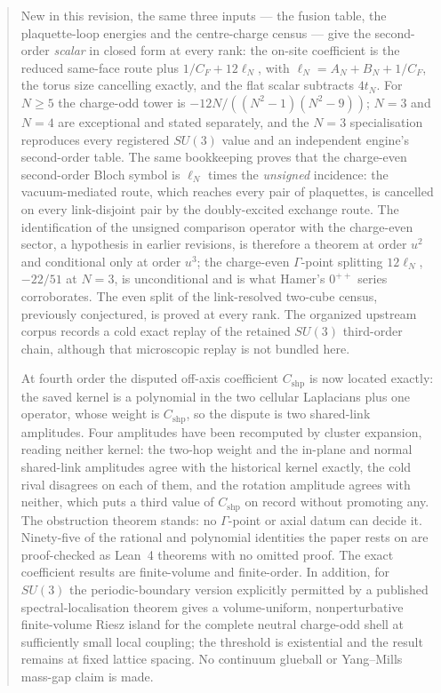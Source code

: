 \documentclass[11pt]{article}
\theoremstyle{plain}
\theoremstyle{definition}
\theoremstyle{remark}
\begin{document}
\begin{abstract}
New in this revision, the same three inputs --- the fusion table, the
plaquette-loop energies and the centre-charge census --- give the second-order
\emph{scalar} in closed form at every rank: the on-site coefficient is the
reduced same-face route plus $1/C_F+12\ell_N$, with $\ell_N=A_N+B_N+1/C_F$,
the torus size cancelling exactly, and the flat scalar subtracts $4t_N$. For
$N\ge5$ the charge-odd tower is $-12N/((N^2-1)(N^2-9))$; $N=3$ and $N=4$ are
exceptional and stated separately, and the $N=3$ specialisation reproduces
every registered $SU(3)$ value and an independent engine's second-order table.
The same bookkeeping proves that the charge-even second-order Bloch symbol is
$\ell_N$ times the \emph{unsigned} incidence: the vacuum-mediated route, which
reaches every pair of plaquettes, is cancelled on every link-disjoint pair by
the doubly-excited exchange route. The identification of the unsigned
comparison operator with the charge-even sector, a hypothesis in earlier
revisions, is therefore a theorem at order $u^2$ and conditional only at order
$u^3$; the charge-even $\Gamma$-point splitting $12\ell_N$, $-22/51$ at $N=3$,
is unconditional and is what Hamer's $0^{++}$ series corroborates. The even
split of the link-resolved two-cube census, previously conjectured, is proved
at every rank. The organized upstream corpus records a cold exact replay of
the retained $SU(3)$ third-order chain, although that microscopic replay is not
bundled here.

At fourth order the disputed off-axis coefficient $C_{\mathrm{shp}}$ is now
located exactly: the saved kernel is a polynomial in the two cellular
Laplacians plus one operator, whose weight is $C_{\mathrm{shp}}$, so the
dispute is two shared-link amplitudes. Four amplitudes have been recomputed
by cluster expansion, reading neither kernel: the two-hop weight and the
in-plane and normal shared-link amplitudes agree with the historical kernel
exactly, the cold rival disagrees on each of them, and the rotation amplitude
agrees with neither, which puts a third value of $C_{\mathrm{shp}}$ on record
without promoting any. The obstruction theorem stands: no $\Gamma$-point or
axial datum can decide it. Ninety-five of the rational and polynomial
identities the paper rests on are proof-checked as Lean~4 theorems with no
omitted proof.
The exact coefficient results are finite-volume and finite-order. In addition,
for $SU(3)$ the periodic-boundary version explicitly permitted by a published
spectral-localisation theorem gives a volume-uniform, nonperturbative
finite-volume Riesz island
for the complete neutral charge-odd
shell at sufficiently small local coupling; the threshold is existential and
the result remains at fixed lattice spacing. No continuum glueball or
Yang--Mills mass-gap claim is made.
\end{abstract}
\end{document}
